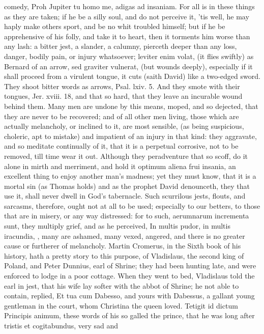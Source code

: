 {comedy, Proh Jupiter tu homo me, adigas ad insaniam. For all is in
these things as they are taken; if he be a silly soul, and do not
perceive it, 'tis well, he may haply make others sport, and be no whit
troubled himself; but if he be apprehensive of his folly, and take it
to heart, then it torments him worse than any lash: a bitter jest, a
slander, a calumny, pierceth deeper than any loss, danger, bodily pain,
or injury whatsoever; leviter enim volat, (it flies swiftly) as Bernard
of an arrow, sed graviter vulnerat, (but wounds deeply), especially if
it shall proceed from a virulent tongue, it cuts (saith David) like a
two-edged sword. They shoot bitter words as arrows, Psal. lxiv. 5. And
they smote with their tongues, Jer. xviii. 18, and that so hard, that
they leave an incurable wound behind them. Many men are undone by this
means, moped, and so dejected, that they are never to be recovered; and
of all other men living, those which are actually melancholy, or
inclined to it, are most sensible, (as being suspicious, choleric, apt
to mistake) and impatient of an injury in that kind: they aggravate,
and so meditate continually of it, that it is a perpetual corrosive,
not to be removed, till time wear it out. Although they peradventure
that so scoff, do it alone in mirth and merriment, and hold it optimum
aliena frui insania, an excellent thing to enjoy another man's madness;
yet they must know, that it is a mortal sin (as Thomas holds) and
as the prophet David denounceth, they that use it, shall never
dwell in God's tabernacle.
Such scurrilous jests, flouts, and sarcasms, therefore, ought not at
all to be used; especially to our betters, to those that are in misery,
or any way distressed: for to such, aerumnarum incrementa sunt, they
multiply grief, and as he perceived, In multis pudor, in multis
iracundia, \etc{}, many are ashamed, many vexed, angered, and there is no
greater cause or furtherer of melancholy. Martin Cromerus, in the Sixth
book of his history, hath a pretty story to this purpose, of
Vladislaus, the second king of Poland, and Peter Dunnius, earl of
Shrine; they had been hunting late, and were enforced to lodge in a
poor cottage. When they went to bed, Vladislaus told the earl in jest,
that his wife lay softer with the abbot of Shrine; he not able to
contain, replied, Et tua cum Dabesso, and yours with Dabessus, a
gallant young gentleman in the court, whom Christina the queen loved.
Tetigit id dictum Principis animum, these words of his so galled the
prince, that he was long after tristis et cogitabundus, very sad and
}
